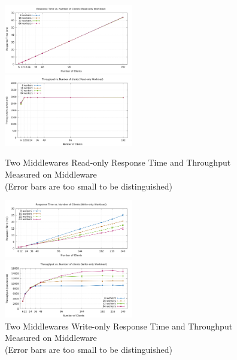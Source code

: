\begin{figure}[!h]
\parbox{.5\linewidth}{
\centering
\includegraphics[width=0.5\textwidth]{img/3_2_responsetime_readonly_mw.png}
}
\parbox{.5\linewidth}{
\centering
\includegraphics[width=0.5\textwidth]{img/3_2_throughput_readonly_mw.png}
}
\captionsetup{justification=centering}
\caption{\label{fig:3.2readonly}Two Middlewares Read-only Response Time and Throughput Measured on Middleware \\(Error bars are too small to be distinguished)}

\parbox{.5\linewidth}{
\centering
\includegraphics[width=0.5\textwidth]{img/3_2_responsetime_writeonly_mw.png}
}
\parbox{.5\linewidth}{
\centering
\includegraphics[width=0.5\textwidth]{img/3_2_throughput_writeonly_mw.png}
}
\captionsetup{justification=centering}
\caption{\label{fig:3.2writeonly}Two Middlewares Write-only Response Time and Throughput Measured on Middleware \\(Error bars are too small to be distinguished)}
\end{figure}

